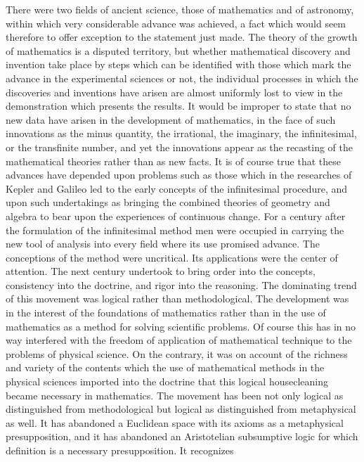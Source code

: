 \documentclass[12pt]{article}
\begin{document}
There were two fields of ancient science, those of
mathematics and of astronomy, within which very considerable
advance was achieved, a fact which would
seem therefore to offer exception to the statement just
made. The theory of the growth of mathematics is a
disputed territory, but whether mathematical discovery
and invention take place by steps which can be identified
with those which mark the advance in the experimental
sciences or not, the individual processes in which
the discoveries and inventions have arisen are almost
uniformly lost to view in the demonstration which presents
the results. It would be improper to state that
no new data have arisen in the development of mathematics,
in the face of such innovations as the minus
quantity, the irrational, the imaginary, the infinitesimal,
or the transfinite number, and yet the innovations
appear as the recasting of the mathematical theories
rather than as new facts. It is of course true that
these advances have depended upon problems such as
those which in the researches of Kepler and Galileo
led to the early concepts of the infinitesimal procedure,
and upon such undertakings as bringing the combined
theories of geometry and algebra to bear upon the
experiences of continuous change. For a century after
the formulation of the infinitesimal method men were
occupied in carrying the new tool of analysis into
every field where its use promised advance. The
conceptions of the method were uncritical. Its applications
were the center of attention. The next
century undertook to bring order into the concepts,
consistency into the doctrine, and rigor into the
reasoning. The dominating trend of this movement
was logical rather than methodological. The development
was in the interest of the foundations of
mathematics rather than in the use of mathematics
as a method for solving scientific problems. Of course
this has in no way interfered with the freedom of
application of mathematical technique to the problems
of physical science. On the contrary, it was on account
of the richness and variety of the contents which the
use of mathematical methods in the physical sciences
imported into the doctrine that this logical housecleaning
became necessary in mathematics. The movement
has been not only logical as distinguished from methodological
but logical as distinguished from metaphysical
as well. It has abandoned a Euclidean space with its
axioms as a metaphysical presupposition, and it has
abandoned an Aristotelian subsumptive logic for which
definition is a necessary presupposition. It recognizes
\end{document}
